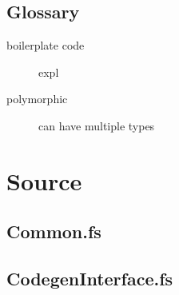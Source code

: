 \documentclass[10pt,a4paper]{article}
\begin{document}
\pagestyle{empty} 


\newpage

\setcounter{secnumdepth}{2} 
\setcounter{tocdepth}{2}


\setcounter{page}{1}
\pagestyle{plain}

\begin{multicols}{2}
\tableofcontents
\columnbreak




















\printbibliography
\end{multicols}
\newpage

\setcounter{section}{0}
\renewcommand\thesection{\Alph{section}}



\begin{multicols}{2}
\section{Glossary}
\begin{description}
    \item[boilerplate code] expl
    \item[polymorphic] can have multiple types
\end{description}
\end{multicols}
\newpage


\section{Source}
\subsection{Common.fs} 

\subsection{CodegenInterface.fs} 

\end{document}
